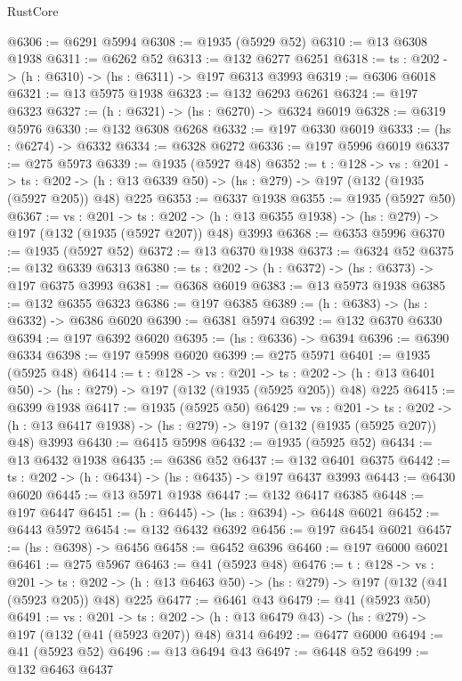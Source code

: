 \begin{lexlean}{RustCore}
\begin{coremodule}
@6306 := @6291 @5994
@6308 := @1935 (@5929 @52)
@6310 := @13 @6308 @1938
@6311 := @6262 @52
@6313 := @132 @6277 @6251
@6318 := {ts : @202} -> (h : @6310) -> (hs : @6311) -> @197 @6313 @3993
@6319 := @6306 @6018
@6321 := @13 @5975 @1938
@6323 := @132 @6293 @6261
@6324 := @197 @6323
@6327 := (h : @6321) -> (hs : @6270) -> @6324 @6019
@6328 := @6319 @5976
@6330 := @132 @6308 @6268
@6332 := @197 @6330 @6019
@6333 := (hs : @6274) -> @6332
@6334 := @6328 @6272
@6336 := @197 @5996 @6019
@6337 := @275 @5973
@6339 := @1935 (@5927 @48)
@6352 := {t : @128} ->
  {vs : @201} ->
  {ts : @202} -> (h : @13 @6339 @50) -> (hs : @279) -> @197 (@132 (@1935 (@5927 @205)) @48) @225
@6353 := @6337 @1938
@6355 := @1935 (@5927 @50)
@6367 := {vs : @201} ->
  {ts : @202} -> (h : @13 @6355 @1938) -> (hs : @279) -> @197 (@132 (@1935 (@5927 @207)) @48) @3993
@6368 := @6353 @5996
@6370 := @1935 (@5927 @52)
@6372 := @13 @6370 @1938
@6373 := @6324 @52
@6375 := @132 @6339 @6313
@6380 := {ts : @202} -> (h : @6372) -> (hs : @6373) -> @197 @6375 @3993
@6381 := @6368 @6019
@6383 := @13 @5973 @1938
@6385 := @132 @6355 @6323
@6386 := @197 @6385
@6389 := (h : @6383) -> (hs : @6332) -> @6386 @6020
@6390 := @6381 @5974
@6392 := @132 @6370 @6330
@6394 := @197 @6392 @6020
@6395 := (hs : @6336) -> @6394
@6396 := @6390 @6334
@6398 := @197 @5998 @6020
@6399 := @275 @5971
@6401 := @1935 (@5925 @48)
@6414 := {t : @128} ->
  {vs : @201} ->
  {ts : @202} -> (h : @13 @6401 @50) -> (hs : @279) -> @197 (@132 (@1935 (@5925 @205)) @48) @225
@6415 := @6399 @1938
@6417 := @1935 (@5925 @50)
@6429 := {vs : @201} ->
  {ts : @202} -> (h : @13 @6417 @1938) -> (hs : @279) -> @197 (@132 (@1935 (@5925 @207)) @48) @3993
@6430 := @6415 @5998
@6432 := @1935 (@5925 @52)
@6434 := @13 @6432 @1938
@6435 := @6386 @52
@6437 := @132 @6401 @6375
@6442 := {ts : @202} -> (h : @6434) -> (hs : @6435) -> @197 @6437 @3993
@6443 := @6430 @6020
@6445 := @13 @5971 @1938
@6447 := @132 @6417 @6385
@6448 := @197 @6447
@6451 := (h : @6445) -> (hs : @6394) -> @6448 @6021
@6452 := @6443 @5972
@6454 := @132 @6432 @6392
@6456 := @197 @6454 @6021
@6457 := (hs : @6398) -> @6456
@6458 := @6452 @6396
@6460 := @197 @6000 @6021
@6461 := @275 @5967
@6463 := @41 (@5923 @48)
@6476 := {t : @128} ->
  {vs : @201} ->
  {ts : @202} -> (h : @13 @6463 @50) -> (hs : @279) -> @197 (@132 (@41 (@5923 @205)) @48) @225
@6477 := @6461 @43
@6479 := @41 (@5923 @50)
@6491 := {vs : @201} ->
  {ts : @202} -> (h : @13 @6479 @43) -> (hs : @279) -> @197 (@132 (@41 (@5923 @207)) @48) @314
@6492 := @6477 @6000
@6494 := @41 (@5923 @52)
@6496 := @13 @6494 @43
@6497 := @6448 @52
@6499 := @132 @6463 @6437

\end{coremodule}
\end{lexlean}
